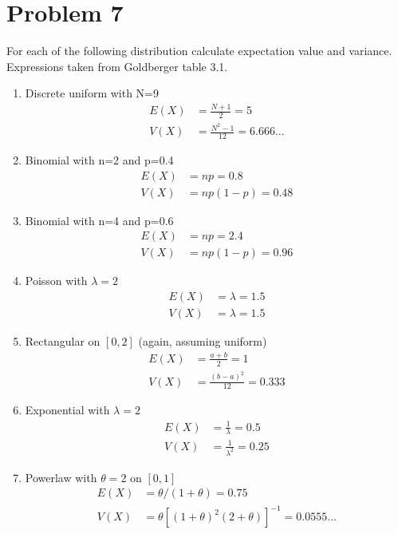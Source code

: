\documentclass{article}
\newcommand{\1}{\mathbf{1}}
\begin{document}
\newpage
\section*{Problem 7}
For each of the following distribution calculate expectation value and variance. Expressions taken from Goldberger table 3.1.
\begin{enumerate}
    \item Discrete uniform with N=9
    \begin{align*}
        E(X) &= \frac{N+1}{2} = 5 \\
        V(X) &= \frac{N^2-1}{12} = 6.666...
    \end{align*}
    
    \item Binomial with n=2 and p=0.4
    \begin{align*}
    E(X) &= np = 0.8 \\
    V(X) &= np(1-p) = 0.48
    \end{align*}
    
    \item Binomial with n=4 and p=0.6
    \begin{align*}
    E(X) &= np = 2.4 \\
    V(X) &= np(1-p) = 0.96
    \end{align*}
    
    \item Poisson with $\lambda=2$
    \begin{align*}
    E(X) &= \lambda = 1.5 \\
    V(X) &= \lambda = 1.5
    \end{align*}
    
    \item Rectangular on $[0,2]$ (again, assuming uniform)
    \begin{align*}
    E(X) &= \frac{a+b}{2} = 1 \\
    V(X) &= \frac{(b-a)^2}{12} = 0.333
    \end{align*}

    \item Exponential with $\lambda=2$
    \begin{align*}
    E(X) &= \frac{1}{\lambda} = 0.5 \\
    V(X) &= \frac{1}{\lambda^2} = 0.25
    \end{align*}
    
    \item Powerlaw with $\theta=2$ on $[0,1]$
    \begin{align*}
    E(X) &= \theta/(1+\theta) = 0.75 \\
    V(X) &= \theta\left[ (1+\theta)^2(2+\theta)\right]^{-1} = 0.0555...
    \end{align*}
\end{enumerate}
\end{document}
